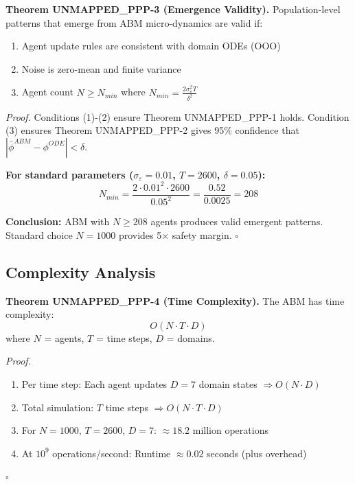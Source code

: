 \begin{tcolorbox}[colback=green!5!white, colframe=green!75!black, title=Theorem UNMAPPED_PPP-3: Emergence Validity]
\textbf{Theorem UNMAPPED_PPP-3 (Emergence Validity).}
Population-level patterns that emerge from ABM micro-dynamics are valid if:
\begin{enumerate}[nosep]
\item Agent update rules are consistent with domain ODEs (OOO)
\item Noise is zero-mean and finite variance
\item Agent count $N \geq N_{min}$ where $N_{min} = \frac{2\sigma^2_\varepsilon T}{\delta^2}$
\end{enumerate}

\textit{Proof.}
Conditions (1)-(2) ensure Theorem UNMAPPED_PPP-1 holds. Condition (3) ensures Theorem UNMAPPED_PPP-2
gives 95\% confidence that $|\bar{\phi}^{ABM} - \phi^{ODE}| < \delta$.

\textbf{For standard parameters ($\sigma_\varepsilon = 0.01$, $T = 2600$, $\delta = 0.05$):}
\begin{equation}
N_{min} = \frac{2 \cdot 0.01^2 \cdot 2600}{0.05^2} = \frac{0.52}{0.0025} = 208
\end{equation}

\textbf{Conclusion:} ABM with $N \geq 208$ agents produces valid emergent patterns.
Standard choice $N = 1000$ provides 5× safety margin.
\hfill $\square$
\end{tcolorbox}

\subsection{Complexity Analysis}

\begin{tcolorbox}[colback=yellow!5!white, colframe=yellow!75!black, title=Theorem UNMAPPED_PPP-4: Computational Complexity]
\textbf{Theorem UNMAPPED_PPP-4 (Time Complexity).}
The ABM has time complexity:
\begin{equation}
O(N \cdot T \cdot D)
\end{equation}
where $N$ = agents, $T$ = time steps, $D$ = domains.

\textit{Proof.}
\begin{enumerate}[nosep]
\item Per time step: Each agent updates $D = 7$ domain states $\Rightarrow O(N \cdot D)$
\item Total simulation: $T$ time steps $\Rightarrow O(N \cdot T \cdot D)$
\item For $N = 1000$, $T = 2600$, $D = 7$: $\approx 18.2$ million operations
\item At $10^9$ operations/second: Runtime $\approx 0.02$ seconds (plus overhead)
\end{enumerate}
\hfill $\square$
\end{tcolorbox}

